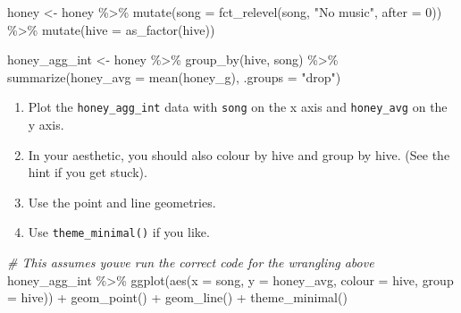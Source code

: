 \documentclass[
  openany]{book}
\newenvironment{Shaded}{\begin{snugshade}}{\end{snugshade}}
\newcommand{\AttributeTok}[1]{\textcolor[rgb]{0.77,0.63,0.00}{#1}}
\newcommand{\CommentTok}[1]{\textcolor[rgb]{0.56,0.35,0.01}{\textit{#1}}}
\newcommand{\DecValTok}[1]{\textcolor[rgb]{0.00,0.00,0.81}{#1}}
\newcommand{\FunctionTok}[1]{\textcolor[rgb]{0.00,0.00,0.00}{#1}}
\newcommand{\NormalTok}[1]{#1}
\newcommand{\OtherTok}[1]{\textcolor[rgb]{0.56,0.35,0.01}{#1}}
\newcommand{\SpecialCharTok}[1]{\textcolor[rgb]{0.00,0.00,0.00}{#1}}
\newcommand{\StringTok}[1]{\textcolor[rgb]{0.31,0.60,0.02}{#1}}
\providecommand{\tightlist}{%
  \setlength{\itemsep}{0pt}\setlength{\parskip}{0pt}}
\begin{document}
\begin{Shaded}
\begin{Highlighting}[]
\NormalTok{honey }\OtherTok{\textless{}{-}}\NormalTok{ honey }\SpecialCharTok{\%\textgreater{}\%} 
  \FunctionTok{mutate}\NormalTok{(}\AttributeTok{song =} \FunctionTok{fct\_relevel}\NormalTok{(song, }\StringTok{"No music"}\NormalTok{, }\AttributeTok{after =} \DecValTok{0}\NormalTok{)) }\SpecialCharTok{\%\textgreater{}\%} 
  \FunctionTok{mutate}\NormalTok{(}\AttributeTok{hive =} \FunctionTok{as\_factor}\NormalTok{(hive)) }
  
\NormalTok{honey\_agg\_int }\OtherTok{\textless{}{-}}\NormalTok{ honey }\SpecialCharTok{\%\textgreater{}\%}   
  \FunctionTok{group\_by}\NormalTok{(hive, song) }\SpecialCharTok{\%\textgreater{}\%} 
  \FunctionTok{summarize}\NormalTok{(}\AttributeTok{honey\_avg =} \FunctionTok{mean}\NormalTok{(honey\_g), }\AttributeTok{.groups =} \StringTok{"drop"}\NormalTok{) }
\end{Highlighting}
\end{Shaded}

\begin{enumerate}
\def\labelenumi{\arabic{enumi}.}
\tightlist
\item
  Plot the \texttt{honey\_agg\_int} data with \texttt{song} on the x axis and \texttt{honey\_avg} on the y axis.
\item
  In your aesthetic, you should also colour by hive and group by hive. (See the hint if you get stuck).
\item
  Use the point and line geometries.
\item
  Use \texttt{theme\_minimal()} if you like.
\end{enumerate}

\begin{Shaded}
\begin{Highlighting}[]
\CommentTok{\# This assumes you\textquotesingle{}ve run the correct code for the wrangling above}
\NormalTok{honey\_agg\_int }\SpecialCharTok{\%\textgreater{}\%} 
  \FunctionTok{ggplot}\NormalTok{(}\FunctionTok{aes}\NormalTok{(}\AttributeTok{x =}\NormalTok{ song, }\AttributeTok{y =}\NormalTok{ honey\_avg, }\AttributeTok{colour =}\NormalTok{ hive, }\AttributeTok{group =}\NormalTok{ hive)) }\SpecialCharTok{+}
  \FunctionTok{geom\_point}\NormalTok{() }\SpecialCharTok{+}
  \FunctionTok{geom\_line}\NormalTok{() }\SpecialCharTok{+}
  \FunctionTok{theme\_minimal}\NormalTok{()}
\end{Highlighting}
\end{Shaded}
\end{document}
